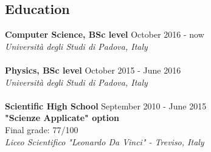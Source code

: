 \documentclass[margin, 10pt]{res}
\begin{document}
\begin{resume}
\section{Education}
\textbf{Computer Science, BSc level} \hfill October 2016 - now \\
\textit{Università degli Studi di Padova, Italy} \\ \\
\textbf{Physics, BSc level} \hfill October 2015 - June 2016 \\
\textit{Università degli Studi di Padova, Italy} \\ \\
\textbf{Scientific High School} \hfill September 2010 - June 2015 \\
\textbf{"Scienze Applicate" option} \\
Final grade: 77/100 \\
\textit{Liceo Scientifico "Leonardo Da Vinci" - Treviso, Italy} 


\end{resume}
\end{document}
